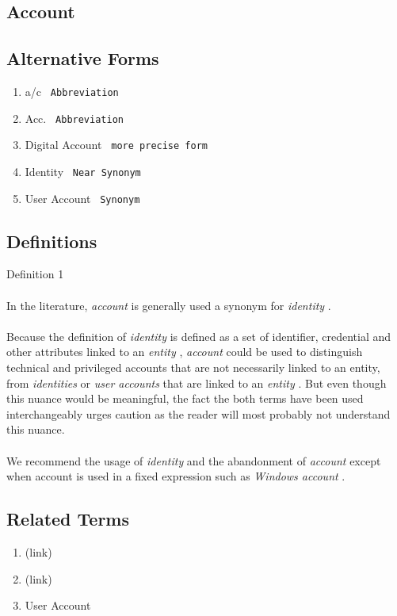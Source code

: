 \newpage \subsection*{Account } \subsection*{Alternative Forms } \begin{enumerate} \item  a/c  \texttt{ Abbreviation  } \item  Acc.  \texttt{ Abbreviation  } \item  Digital Account  \texttt{ more precise form  } \item  Identity  \texttt{ Near Synonym  } \item  User Account  \texttt{ Synonym  }   \end{enumerate} \subsection*{Definitions } \begin{DIC_Def}{Definition 1 }{} \paragraph{} In the literature,  \emph{ account  } is generally used a synonym for  \emph{ identity  } .  \paragraph{} Because the definition of  \emph{ identity  } is defined as a set of identifier, credential and other attributes linked to an  \emph{ entity  } ,  \emph{ account  } could be used to distinguish technical and privileged accounts that are not necessarily linked to an entity, from  \emph{ identities  } or  \emph{ user accounts  } that are linked to an  \emph{ entity  } . But even though this nuance would be meaningful, the fact the both terms have been used interchangeably urges caution as the reader will most probably not understand this nuance.  \paragraph{} We recommend the usage of  \emph{ identity  } and the abandonment of  \emph{ account  } except when account is used in a fixed expression such as  \emph{ Windows account  } .  \end{DIC_Def} \subsection*{Related Terms } \begin{enumerate} \item  (link) \href{Identity (Dictionary Entry) }{ } \item  (link) \href{Orphan Account (Dictionary Entry) }{ } \item  User Account  \end{enumerate} 